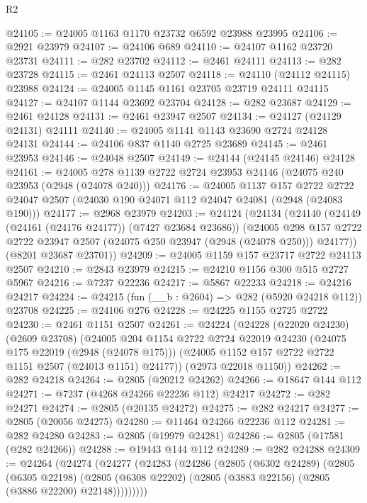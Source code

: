 \begin{lexlean}{R2}
\begin{coremodule}
@24105 := @24005 @1163 @1170 @23732 @6592 @23988 @23995
@24106 := @2921 @23979
@24107 := @24106 @689
@24110 := @24107 @1162 @23720 @23731
@24111 := @282 @23702
@24112 := @2461 @24111
@24113 := @282 @23728
@24115 := @2461 @24113 @2507
@24118 := @24110 (@24112 @24115) @23988
@24124 := @24005 @1145 @1161 @23705 @23719 @24111 @24115
@24127 := @24107 @1144 @23692 @23704
@24128 := @282 @23687
@24129 := @2461 @24128
@24131 := @2461 @23947 @2507
@24134 := @24127 (@24129 @24131) @24111
@24140 := @24005 @1141 @1143 @23690 @2724 @24128 @24131
@24144 := @24106 @837 @1140 @2725 @23689
@24145 := @2461 @23953
@24146 := @24048 @2507
@24149 := @24144 (@24145 @24146) @24128
@24161 := @24005 @278 @1139 @2722 @2724 @23953 @24146 (@24075 @240 @23953 (@2948 (@24078 @240)))
@24176 := @24005
    @1137
    @157
    @2722
    @2722
    @24047
    @2507
    (@24030 @190 @24071 @112 @24047 @24081 (@2948 (@24083 @190)))
@24177 := @2968 @23979
@24203 := @24124
    (@24134
      (@24140
        (@24149 (@24161 (@24176 @24177)) (@7427 @23684 @23686))
        (@24005
          @298
          @157
          @2722
          @2722
          @23947
          @2507
          (@24075 @250 @23947 (@2948 (@24078 @250)))
          @24177))
      (@8201 @23687 @23701))
@24209 := @24005 @1159 @157 @23717 @2722 @24113 @2507
@24210 := @2843 @23979
@24215 := @24210 @1156 @300 @515 @2727 @5967
@24216 := @7237 @22236
@24217 := @5867 @22233
@24218 := @24216 @24217
@24224 := @24215 (fun (__b : @2604) => @282 (@5920 @24218 @112)) @23708
@24225 := @24106 @276
@24228 := @24225 @1155 @2725 @2722
@24230 := @2461 @1151 @2507
@24261 := @24224
    (@24228
      (@22020 @24230)
      (@2609 @23708)
      (@24005
        @204
        @1154
        @2722
        @2724
        @22019
        @24230
        (@24075 @175 @22019 (@2948 (@24078 @175)))
        (@24005 @1152 @157 @2722 @2722 @1151 @2507 (@24013 @1151) @24177))
      (@2973 @22018 @1150))
@24262 := @282 @24218
@24264 := @2805 (@20212 @24262)
@24266 := @18647 @144 @112
@24271 := @7237 (@4268 @24266 @22236 @112) @24217
@24272 := @282 @24271
@24274 := @2805 (@20135 @24272)
@24275 := @282 @24217
@24277 := @2805 (@20056 @24275)
@24280 := @11464 @24266 @22236 @112
@24281 := @282 @24280
@24283 := @2805 (@19979 @24281)
@24286 := @2805 (@17581 (@282 @24266))
@24288 := @19443 @144 @112
@24289 := @282 @24288
@24309 := @24264
    (@24274
      (@24277
        (@24283
          (@24286
            (@2805
              (@6302 @24289)
              (@2805
                (@6305 @22198)
                (@2805 (@6308 @22202) (@2805 (@3883 @22156) (@2805 (@3886 @22200) @22148)))))))))

\end{coremodule}
\end{lexlean}
